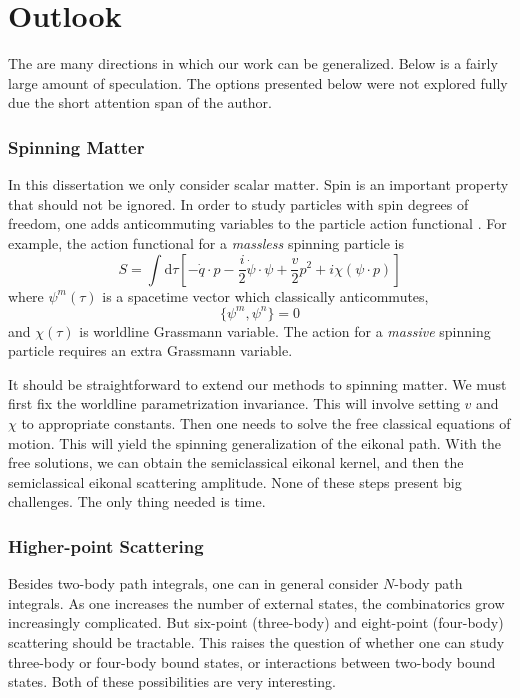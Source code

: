 \section{Outlook}
The are many directions in which our work can be generalized. Below is a fairly large amount of speculation. The options presented below were not explored fully due the short attention span of the author.
\subsubsection*{Spinning Matter}
In this dissertation we only consider scalar matter. Spin is an important property that should not be ignored. In order to study particles with spin degrees of freedom, one adds anticommuting variables to the particle action functional \cite{Brink:1976uf}. For example, the action functional for a \textit{massless} spinning particle is
\begin{equation}
	S = \int \mathrm{d}\tau \left[ -\dot{q} \cdot p - \frac{i}{2} \dot{\psi} \cdot \psi + \frac{v}{2}p^{2} + i \chi \left( \psi \cdot p \right) \right]
\end{equation}
where $\psi^{m}(\tau)$ is a spacetime vector which classically anticommutes,
\begin{equation}
	\lbrace \psi^{m}, \psi^{n} \rbrace = 0
\end{equation}
and $\chi(\tau)$ is worldline Grassmann variable. The action for a \textit{massive} spinning particle requires an extra Grassmann variable.

It should be straightforward to extend our methods to spinning matter. We must first fix the worldline parametrization invariance. This will involve setting $v$ and $\chi$ to appropriate constants. Then one needs to solve the free classical equations of motion. This will yield the spinning generalization of the eikonal path. With the free solutions, we can obtain the semiclassical eikonal kernel, and then the semiclassical eikonal scattering amplitude. None of these steps present big challenges. The only thing needed is time.
\subsubsection*{Higher-point Scattering}
Besides two-body path integrals, one can in general consider $N$-body path integrals. As one increases the number of external states, the combinatorics grow increasingly complicated. But six-point (three-body) and eight-point (four-body) scattering should be tractable. This raises the question of whether one can study three-body or four-body bound states, or interactions between two-body bound states. Both of these possibilities are very interesting.
